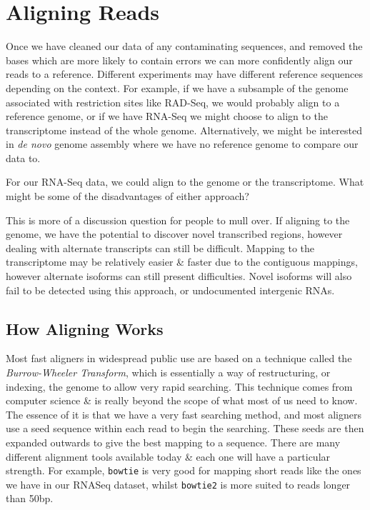 \chapter{Aligning Reads}


\begin{note}
Once we have cleaned our data of any contaminating sequences, and removed the bases which are more likely to contain errors we can more confidently align our reads to a reference.
Different experiments may have different reference sequences depending on the context.
For example, if we have a subsample of the genome associated with restriction sites like RAD-Seq, we would probably align to a reference genome, or if we have RNA-Seq we might choose to align to the transcriptome instead of the whole genome.
Alternatively, we might be interested in \textit{de novo} genome assembly where we have no reference genome to compare our data to.
\end{note}

\begin{questions}
For our RNA-Seq data, we could align to the genome or the transcriptome.
What might be some of the disadvantages of either approach? \\
\begin{answer}
This is more of a discussion question for people to mull over.
If aligning to the genome, we have the potential to discover novel transcribed regions, however dealing with alternate transcripts can still be difficult.
Mapping to the transcriptome may be relatively easier \& faster due to the contiguous mappings, however alternate isoforms can still present difficulties.
Novel isoforms will also fail to be detected using this approach, or undocumented intergenic RNAs. \\
\end{answer}
\end{questions}

\section{How Aligning Works}
\begin{note}
Most fast aligners in widespread public use are based on a technique called the \textit{Burrow-Wheeler Transform}, which is essentially a way of restructuring, or indexing, the genome to allow very rapid searching.
This technique comes from computer science \& is really beyond the scope of what most of us need to know.
The essence of it is that we have a very fast searching method, and most aligners use a seed sequence within each read to begin the searching.
These seeds are then expanded outwards to give the best mapping to a sequence.
There are many different alignment tools available today \& each one will have a particular strength.
For example, \texttt{bowtie} is very good for mapping short reads like the ones we have in our RNASeq dataset, whilst \texttt{bowtie2} is more suited to reads longer than 50bp.
\end{note}

